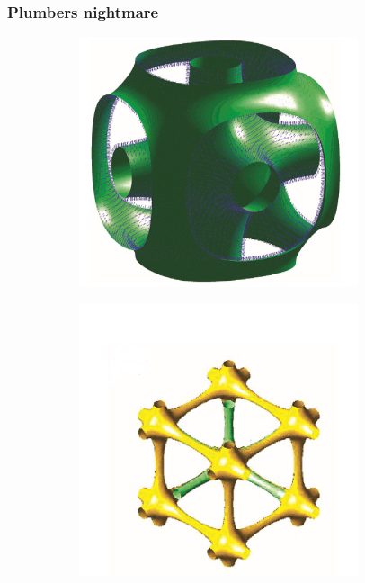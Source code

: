 \documentclass{beamer} %
\begin{document}
\begin{frame}
\frametitle{Plumbers nightmare}
\begin{figure}[H]
\centering
\begin{subfigure}[c]{0.45\textwidth}
\centering
\includegraphics[width = 0.9\textwidth]{PlumbersNightmare1.JPG}
\end{subfigure}
\begin{subfigure}[c]{0.45\textwidth}
\centering
\includegraphics[width = 0.9\textwidth]{PlumbersNightmare2.JPG}
\end{subfigure}
\end{figure}

\end{frame}



\begin{frame}
\cite{DocGrundlagen}
\cite{MolKueche}
\cite{Schokolade}
\cite{RatselKochkunst}
\end{frame}
\end{document}
